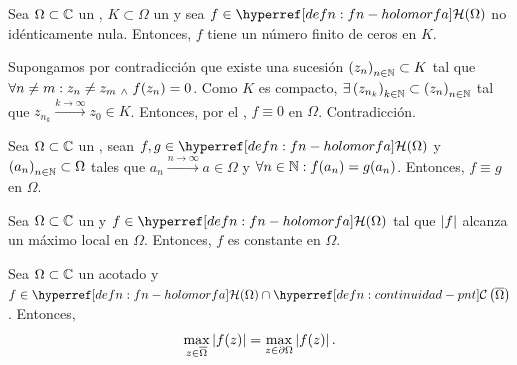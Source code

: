 \begin{cor}\label{cor:fn-holomorfa-compacto-imp-finitud-ceros}
    Sea $\Omega \subset \mathbb{C}$ un , $K \subset \Omega$ un  y sea $f \in \exhyperref[defn:fn-holomorfa]{fn-holomorfa}{\mathcal{H}}(\Omega)$ no idénticamente nula. Entonces, $f$ tiene un número finito de ceros en $K$.
\end{cor}
\begin{dem}
    Supongamos por contradicción que existe una sucesión $\left(z_n\right)_{n \in \mathbb{N}} \subset K$ tal que $\forall n \neq m : z_n \neq z_m \; _{\wedge} \; f(z_n) = 0$. Como $K$ es compacto, $\exists \left(z_{n_k}\right)_{k \in \mathbb{N}} \subset \left(z_n\right)_{n \in \mathbb{N}}$ tal que $z_{n_k} \xrightarrow{k \to \infty} z_0 \in K$. Entonces, por el , $f \equiv 0$ en $\Omega$. Contradicción.
\end{dem}

\begin{cor}\label{cor:principio-identidad}
    Sea $\Omega \subset \mathbb{C}$ un , sean $f, g \in \exhyperref[defn:fn-holomorfa]{fn-holomorfa}{\mathcal{H}}(\Omega)$ y $\left(a_n\right)_{n\in\mathbb{N}} \subset \Omega$ tales que $a_n \xrightarrow{n\to\infty} a \in \Omega$ y $\forall n \in \mathbb{N} : f(a_n) = g(a_n)$. Entonces, $f \equiv g$ en $\Omega$.
\end{cor}

\begin{teo}\label{teo:modulo-maximo}
    Sea $\Omega \subset \mathbb{C}$ un  y $f \in \exhyperref[defn:fn-holomorfa]{fn-holomorfa}{\mathcal{H}}(\Omega)$ tal que $\left|f\right|$ alcanza un máximo local en $\Omega$. Entonces, $f$ es constante en $\Omega$.
\end{teo}

\begin{cor}\label{cor:modulo-maximo}
    Sea $\Omega \subset \mathbb{C}$ un  acotado y $f \in \exhyperref[defn:fn-holomorfa]{fn-holomorfa}{\mathcal{H}}(\Omega) \cap \exhyperref[defn:continuidad-pnt]{continuidad}{\mathcal{C}}\left(\bar{\Omega}\right)$. Entonces,
    \[
    \max_{z \in \overline{\Omega}} \left|f(z)\right| = \max_{z \in \partial \Omega} \left|f(z)\right|.
    \]
\end{cor}

